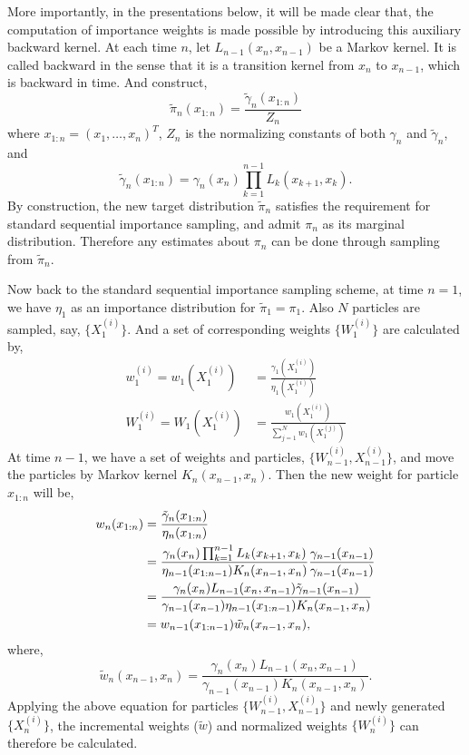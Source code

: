 More importantly, in the presentations below, it will be made clear that, the
computation of importance weights is made possible by introducing this
auxiliary backward kernel. At each time $n$, let $L_{n-1}(x_n,x_{n-1})$ be a
Markov kernel. It is called backward in the sense that it is a transition
kernel from $x_n$ to $x_{n-1}$, which is backward in time. And construct,
\begin{equation}
  \tilde{\pi}_n(x_{1:n}) = \frac{\tilde{\gamma}_n(x_{1:n})}{Z_n}
\end{equation}
where $x_{1:n} = (x_1,\dots,x_n)^T$, $Z_n$ is the normalizing constants of
both $\gamma_n$ and $\tilde{\gamma}_n$, and
\begin{equation}
  \tilde{\gamma}_n(x_{1:n}) = \gamma_n(x_n)
  \prod_{k=1}^{n-1}L_k(x_{k+1},x_k).
\end{equation}
By construction, the new target distribution $\tilde{\pi}_n$ satisfies the
requirement for standard sequential importance sampling, and admit $\pi_n$ as
its marginal distribution. Therefore any estimates about $\pi_n$ can be done
through sampling from $\tilde{\pi}_n$.

Now back to the standard sequential importance sampling scheme, at time $n=1$,
we have $\eta_1$ as an importance distribution for $\tilde{\pi}_1 = \pi_1$.
Also $N$ particles are sampled, say, $\{X_1^{(i)}\}$. And a set of
corresponding weights $\{W_1^{(i)}\}$ are calculated by,
\begin{align}
  w_1^{(i)} =
  w_1(X_1^{(i)}) &= \frac{\gamma_1(X_1^{(i)})}{\eta_1(X_1^{(i)})}
  \label{eq:ini_weight}\\
  W_1^{(i)} =
  W_1(X_1^{(i)}) &= \frac{w_1(X_1^{(i)})}{\sum_{j=1}^Nw_1(X_1^{(j)})}
  \label{eq:ini_weight_norm}
\end{align}
At time $n-1$, we have a set of weights and particles, $\{W_{n-1}^{(i)},
  X_{n-1}^{(i)}\}$, and move the particles by Markov kernel $K_n(x_{n-1},
x_n)$. Then the new weight for particle $x_{1:n}$ will be,
\begin{align}
  w_n(x_{1:n}) &= \frac{\tilde{\gamma}_n(x_{1:n})}{\eta_n(x_{1:n})}
  \allowdisplaybreaks\notag\\
  &= \frac{\gamma_n(x_n)\prod_{k=1}^{n-1}L_k(x_{k+1},x_k)}
  {\eta_{n-1}(x_{1:n-1})K_n(x_{n-1},x_n)}
  \frac{\gamma_{n-1}(x_{n-1})}{\gamma_{n-1}(x_{n-1})} \notag\\
  &= \frac{\gamma_n(x_n)L_{n-1}(x_n,x_{n-1})\tilde{\gamma}_{n-1}(x_{n-1})}
  {\gamma_{n-1}(x_{n-1})\eta_{n-1}(x_{1:n-1})K_n(x_{n-1},x_n)} \notag\\
  &= w_{n-1}(x_{1:n-1})\tilde{w}_n(x_{n-1},x_n),
\end{align}
where,
\begin{equation}
  \tilde{w}_n(x_{n-1},x_n) =
  \frac{\gamma_n(x_n)L_{n-1}(x_n,x_{n-1})}
  {\gamma_{n-1}(x_{n-1})K_n(x_{n-1},x_n)}.
  \label{eq:incr_weight}
\end{equation}
Applying the above equation for particles $\{W_{n-1}^{(i)}, X_{n-1}^{(i)}\}$
and newly generated $\{X_n^{(i)}\}$, the incremental weights ($\tilde{w}$) and
normalized weights $\{W_n^{(i)}\}$ can therefore be calculated.

